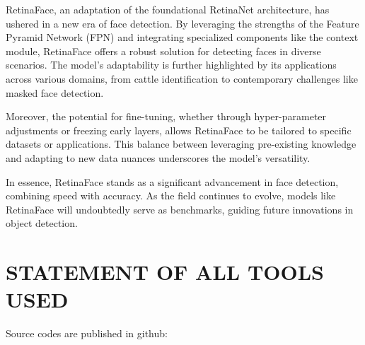 \documentclass{article}
\begin{document}
RetinaFace, an adaptation of the foundational RetinaNet architecture, has ushered in a new era of face detection. By leveraging the strengths of the Feature Pyramid Network (FPN) and integrating specialized components like the context module, RetinaFace offers a robust solution for detecting faces in diverse scenarios. The model's adaptability is further highlighted by its applications across various domains, from cattle identification to contemporary challenges like masked face detection.

Moreover, the potential for fine-tuning, whether through hyper-parameter adjustments or freezing early layers, allows RetinaFace to be tailored to specific datasets or applications. This balance between leveraging pre-existing knowledge and adapting to new data nuances underscores the model's versatility.

In essence, RetinaFace stands as a significant advancement in face detection, combining speed with accuracy. As the field continues to evolve, models like RetinaFace will undoubtedly serve as benchmarks, guiding future innovations in object detection.


\section{STATEMENT OF ALL TOOLS USED}
\label{sec:statementofalltoolsused}


Source codes are published in github: 





\vfill\pagebreak



\end{document}

